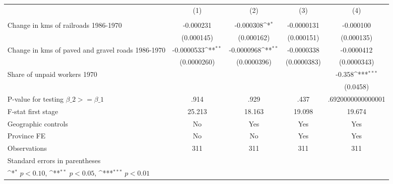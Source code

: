 {
\def\sym#1{\ifmmode^{#1}\else\(^{#1}\)\fi}
\begin{tabular}{l*{4}{c}}
\hline\hline
                &\multicolumn{1}{c}{(1)}&\multicolumn{1}{c}{(2)}&\multicolumn{1}{c}{(3)}&\multicolumn{1}{c}{(4)}\\
                &\multicolumn{1}{c}{}&\multicolumn{1}{c}{}&\multicolumn{1}{c}{}&\multicolumn{1}{c}{}\\
\hline
Change in kms of railroads 1986-1970&-0.000231         &-0.000308\sym{*}  &-0.0000131         &-0.000100         \\
                &(0.000145)         &(0.000162)         &(0.000151)         &(0.000135)         \\
[1em]
Change in kms of paved and gravel roads 1986-1970&-0.0000533\sym{**} &-0.0000968\sym{**} &-0.0000338         &-0.0000412         \\
                &(0.0000260)         &(0.0000396)         &(0.0000383)         &(0.0000343)         \\
[1em]
Share of unpaid workers 1970&                  &                  &                  &   -0.358\sym{***}\\
                &                  &                  &                  & (0.0458)         \\
\hline
P-value for testing $\beta\_{2} >= \beta\_{1}$&     .914         &     .929         &     .437         &.6920000000000001         \\
F-stat first stage&   25.213         &   18.163         &   19.098         &   19.674         \\
Geographic controls&       No         &      Yes         &      Yes         &      Yes         \\
Province FE     &       No         &       No         &      Yes         &      Yes         \\
Observations    &      311         &      311         &      311         &      311         \\
\hline\hline
\multicolumn{5}{l}{\footnotesize Standard errors in parentheses}\\
\multicolumn{5}{l}{\footnotesize \sym{*} \(p<0.10\), \sym{**} \(p<0.05\), \sym{***} \(p<0.01\)}\\
\end{tabular}
}
